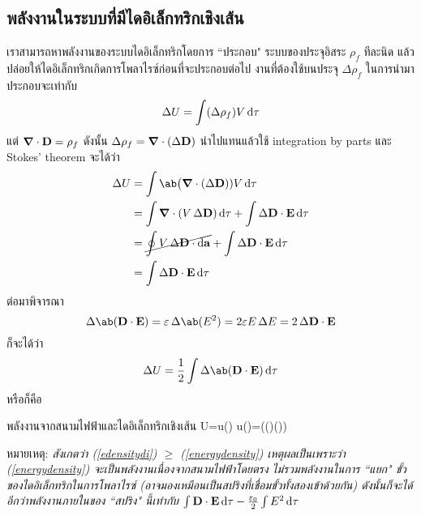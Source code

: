 \subsection{พลังงานในระบบที่มีไดอิเล็กทริกเชิงเส้น}
เราสามารถหาพลังงานของระบบไดอิเล็กทริกโดยการ ``ประกอบ" ระบบของประจุอิสระ $\rho_f$ ทีละนิด แล้วปล่อยให้ไดอิเล็กทริกเกิดการโพลาไรซ์ก่อนที่จะประกอบต่อไป งานที่ต้องใช้บนประจุ $\Delta \rho_f$ ในการนำมาประกอบจะเท่ากับ
\[\Delta U=\int(\Delta\rho_f)V\odif{\tau}\]
แต่ $\boldsymbol{\nabla}\cdot\mathbf{D}=\rho_f$ ดังนั้น $\Delta\rho_f=\boldsymbol{\nabla}\cdot(\Delta\mathbf{D})$ นำไปแทนแล้วใช้ integration by parts และ Stokes' theorem จะได้ว่า
\begin{align*}
    \Delta U&=\int\ab\big(\gd\cdot(\Delta\vD))V\odif{\tau}\\
    &=\int\gd\cdot(V\,\Delta\vD)\odif{\tau}+\int\Delta\vD\cdot\vE\odif{\tau}\\
    &=\cancel{\oint V\,\Delta\vD\cdot\odif{\va}}+\int\Delta\vD\cdot\vE\odif{\tau}\\
    &=\int\Delta\vD\cdot\vE\odif{\tau}
\end{align*}
ต่อมาพิจารณา
\[\Delta\ab(\vD\cdot\vE)=\eps\,\Delta\ab(E^2)=2\eps E\,\Delta E=2\,\Delta\vD\cdot\vE\]
ก็จะได้ว่า
\[\Delta U=\frac{1}{2}\int\Delta\ab(\vD\cdot\vE)\odif{\tau}\]
หรือก็คือ
\begin{ieqbox}{พลังงานจากสนามไฟฟ้าและไดอิเล็กทริกเชิงเส้น}
    U=\int u(\vr)\odif{\tau} u(\vr)=\ab\Big(\vD(\vr)\cdot\vE(\vr))\label{edensitydi}
\end{ieqbox}
หมายเหตุ: \emph{สังเกตว่า (\ref{edensitydi}) $\geq$ (\ref{energydensity}) เหตุผลเป็นเพราะว่า (\ref{energydensity}) จะเป็นพลังงานเนื่องจากสนามไฟฟ้าโดยตรง ไม่รวมพลังงานในการ ``แยก" ขั้วของไดอิเล็กทริกในการโพลาไรซ์ (อาจมองเหมือนเป็นสปริงที่เชื่อมขั้วทั้งสองเข้าด้วยกัน) ดังนั้นก็จะได้อีกว่าพลังงานภายในของ ``สปริง" นี้เท่ากับ $\int \vD\cdot\vE\odif{\tau} - \frac{\eps_0}{2}\int E^2\odif{\tau}$} 
